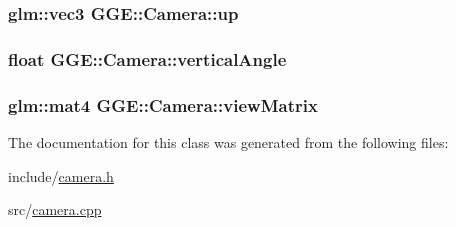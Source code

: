 \hypertarget{class_g_g_e_1_1_camera_a48d161f43a6c2d8a39048bae3d0e1c89}{
\subsubsection[{up}]{\setlength{\rightskip}{0pt plus 5cm}glm\+::vec3 G\+G\+E\+::\+Camera\+::up\hspace{0.3cm}{\ttfamily [private]}}}\label{class_g_g_e_1_1_camera_a48d161f43a6c2d8a39048bae3d0e1c89}
\hypertarget{class_g_g_e_1_1_camera_a15ada6665d1e31494ee175f1668e7655}{
\subsubsection[{vertical\+Angle}]{\setlength{\rightskip}{0pt plus 5cm}float G\+G\+E\+::\+Camera\+::vertical\+Angle\hspace{0.3cm}{\ttfamily [private]}}}\label{class_g_g_e_1_1_camera_a15ada6665d1e31494ee175f1668e7655}
\hypertarget{class_g_g_e_1_1_camera_a221e30f65f6ea2f56effe0f49d788a62}{
\subsubsection[{view\+Matrix}]{\setlength{\rightskip}{0pt plus 5cm}glm\+::mat4 G\+G\+E\+::\+Camera\+::view\+Matrix\hspace{0.3cm}{\ttfamily [private]}}}\label{class_g_g_e_1_1_camera_a221e30f65f6ea2f56effe0f49d788a62}


The documentation for this class was generated from the following files\+:\begin{DoxyCompactItemize}
\item 
include/\hyperlink{camera_8h}{camera.\+h}\item 
src/\hyperlink{camera_8cpp}{camera.\+cpp}\end{DoxyCompactItemize}
